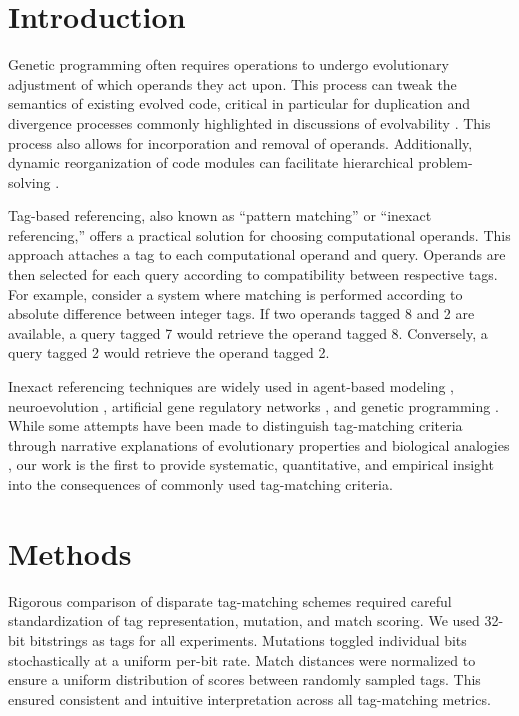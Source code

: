 \section{Introduction} \label{sec:introduction}

Genetic programming often requires operations to undergo evolutionary adjustment of which operands they act upon.
This process can tweak the semantics of existing evolved code, critical in particular for duplication and divergence processes commonly highlighted in discussions of evolvability \citep{altenberg1994evolution}.
This process also allows for incorporation and removal of operands.
Additionally, dynamic reorganization of code modules can facilitate hierarchical problem-solving \citep{Kinnear:Koza:1994:adf}.

Tag-based referencing, also known as ``pattern matching'' or ``inexact referencing,'' offers a practical solution for choosing computational operands.
This approach attaches a tag to each computational operand and query.
Operands are then selected for each query according to compatibility between respective tags.
For example, consider a system where matching is performed according to absolute difference between integer tags.
If two operands tagged 8 and 2 are available, a query tagged 7 would retrieve the operand tagged 8.
Conversely, a query tagged 2 would retrieve the operand tagged 2.

Inexact referencing techniques are widely used in agent-based modeling \citep{riolo2001evolution}, neuroevolution \citep{reisinger2007acquiring}, artificial gene regulatory networks \citep{banzhaf2003artificial}, and genetic programming \citep{spector2011tag, lalejini2018evolving}.
While some attempts have been made to distinguish tag-matching criteria through narrative explanations of evolutionary properties and biological analogies \citep{downing2015intelligence,scherer2004activation}, our work is the first to provide systematic, quantitative, and empirical insight into the consequences of commonly used tag-matching criteria.

\section{Methods}

Rigorous comparison of disparate tag-matching schemes required careful standardization of tag representation, mutation, and match scoring.
We used 32-bit bitstrings as tags for all experiments.
Mutations toggled individual bits stochastically at a uniform per-bit rate.
Match distances were normalized to ensure a uniform distribution of scores between randomly sampled tags.
This ensured consistent and intuitive interpretation across all tag-matching metrics.

